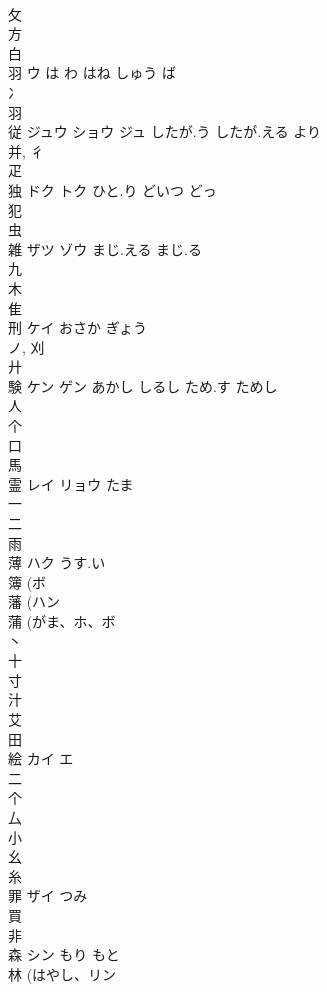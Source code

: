 \documentclass[8pt]{extreport}
\begin{document}
\begin{CJK}{UTF8}{min}
\\	攵 
\\	方 
\\	白 
\\	羽	ウ	は わ はね しゅう ば	
\\	冫 
\\	羽 
\\	従	ジュウ ショウ ジュ	したが.う したが.える より	
\\	并, 彳 
\\	疋 
\\	独	ドク トク	ひと.り どいつ どっ	
\\	犯 
\\	虫 
\\	雑	ザツ ゾウ	まじ.える まじ.る	
\\	九 
\\	木 
\\	隹 
\\	刑	ケイ	おさか ぎょう	
\\	ノ, 刈 
\\	廾 
\\	験	ケン ゲン	あかし しるし ため.す ためし	
\\	人 
\\	个 
\\	口 
\\	馬 
\\	霊	レイ リョウ	たま	
\\	一 
\\	二 
\\	雨 
\\	薄	ハク	うす.い	
\\	簿 (ボ 
\\	藩 (ハン 
\\	蒲 (がま、ホ、ボ 
\\	丶 
\\	十 
\\	寸 
\\	汁 
\\	艾 
\\	田 
\\	絵	カイ エ		
\\	二 
\\	个 
\\	厶 
\\	小 
\\	幺 
\\	糸 
\\	罪	ザイ	つみ	
\\	買 
\\	非 
\\	森	シン	もり もと	
\\	林 (はやし、リン 

\end{CJK}
\end{document}
